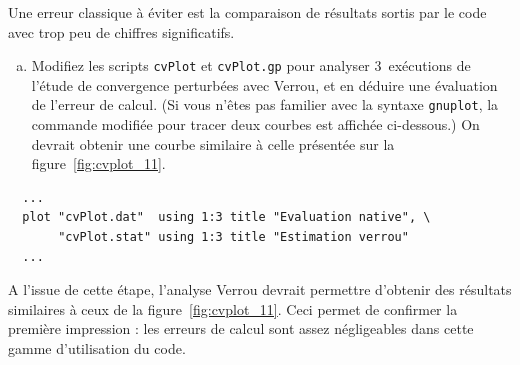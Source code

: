 \documentclass[a4paper]{article}
\def\mdfilename{File}
\newenvironment{file}[1][Fichier]{
  \def\mdfilename{#1}
  \begin{mdframed}[style=file]
}{
  \end{mdframed}
}
\newcounter{Question}
\newenvironment{question}[1][\unskip]{
  \bigskip
  \stepcounter{Question}
  \def\questionTitle{ #1}
  \begin{mdframed}[style=question]
  }{
  \end{mdframed}
}
\newenvironment{warn}[1][Attention :]{
  \begin{mdframed}[style=warning]
    \noindent{\bf #1}
}{
  \end{mdframed}
}
\begin{document}
\bigskip

\begin{warn}
  Une erreur classique à éviter est la comparaison de résultats sortis par le
  code avec trop peu de chiffres significatifs.
\end{warn}

\begin{question}
  \begin{enumerate}[(a)]
  \item Modifiez les scripts \texttt{cvPlot} et \texttt{cvPlot.gp} pour analyser
    3~exécutions de l'étude de convergence perturbées avec Verrou, et en déduire
    une évaluation de l'erreur de calcul. (Si vous n'êtes pas familier avec la
    syntaxe \texttt{gnuplot}, la commande modifiée pour tracer deux courbes est
    affichée ci-dessous.) On devrait obtenir une courbe similaire à celle
    présentée sur la figure~\ref{fig:cvplot_11}.


  \end{enumerate}
\end{question}

\begin{file}[cvPlot.gp]
\begin{verbatim}
  ...
  plot "cvPlot.dat"  using 1:3 title "Evaluation native", \
       "cvPlot.stat" using 1:3 title "Estimation verrou"
  ...
\end{verbatim}
\end{file}

\bigskip

A l'issue de cette étape, l'analyse Verrou devrait permettre d'obtenir des
résultats similaires à ceux de la figure~\ref{fig:cvplot_11}. Ceci permet de
confirmer la première impression : les erreurs de calcul sont assez négligeables
dans cette gamme d'utilisation du code.
\end{document}
